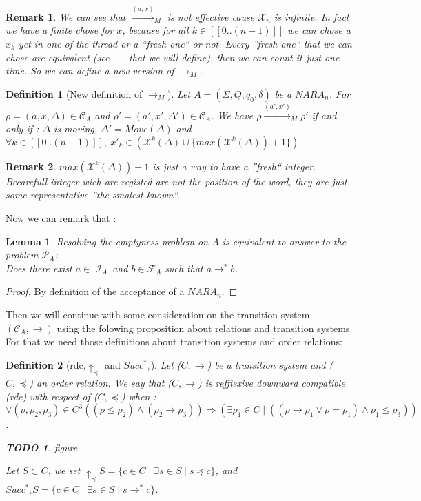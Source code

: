 \documentclass[a4paper,10pt]{report}
\newtheorem{lm}{Lemma}[thr]
\newtheorem{df}{Definition}
\newtheorem{rk}{Remark}
\newtheorem{td}{TODO}
\newcommand{\seg}[1]{[\![#1]\!]}
\newcommand{\ts}{\seg{0 .. (n-1)}}
\newcommand{\C}{\mathcal{C}_{A}}
\newcommand{\I}{\mathcal{I}_{A}}
\newcommand{\F}{\mathcal{F}_{A}}
\newcommand{\Xa}{\mathcal{X}}
\newcommand{\X}{\mathcal{X}_{n}}
\newcommand{\pb}{$\mathcal{P}_{A}$}
\begin{document}
\begin{rk}
  We can see that ${\xrightarrow{(a,x)}}_M$ is not effective cause $\X$ is infinite.
  In fact we have a finite chose for $x$, because for all $ k \in \ts$ we can chose a $x_k$ yet in one of the thread or a ``fresh one`` or not.
  Every ''fresh one`` that we can chose are equivalent (see $\equiv$ that we will define), then we can count it just one time.
  So we can define a new version of ${\xrightarrow{}}_M$. 
\end{rk}

\begin{df}[New definition of $\rightarrow_M$]
  \label{minipb}
  Let $A = (\Sigma ,Q ,q_0, \delta )$ be a $NARA_n$.
  For $\rho = (a,x,\Delta) \in \C$ and $\rho' = (a',x',\Delta') \in \C$.
  We have $\rho {\xrightarrow{(a',x')}}_M \rho'$ if and only if :
  $\Delta$ is moving, $\Delta' = Move(\Delta)$ and $\forall k \in \ts,\ x'_k \in (\Xa^k(\Delta) \cup \{max(\Xa^k(\Delta))+1\}) $  
\end{df}

\begin{rk}
 $max(\Xa^k(\Delta))+1$ is just a way to have a ''fresh`` integer.
 Becarefull integer wich are registed are not the position of the word, they are just some representative ''the smalest known``.  
\end{rk}


Now we can remark that :
\begin{lm}
  \label{lmtth}
  Resolving the emptyness problem on $A$ is equivalent to answer to the problem \pb: \\
  Does there exist $a \in$ $\I$\ and $b \in\F$ such that $ a \rightarrow^* b $. 
\end{lm}
\begin{proof} 
  By definition of the acceptance of a $NARA_n$. 
\end{proof}

Then we will continue with some consideration on the transition system $(\C,\rightarrow)$ using the folowing proposition about relations and transition systems.
For that we need those definitions about transition systems and order relations:

\begin{df}[rdc,$\uparrow_\preceq$ and $ Succ^*_\rightarrow$]
  Let ($C,\rightarrow$) be a transition system and ($C,\preceq$) an order relation.
  We say that ($C,\rightarrow$) is refflexive downward compatible (rdc) with respect of ($C,\preceq$) when :
 $$\forall (\rho,\rho_2,\rho_3) \in C^3  ((\rho \leq \rho_2) \wedge (\rho_2 \rightarrow \rho_3)) \Rightarrow (\exists \rho_1 \in C \mid ((\rho \rightarrow \rho_1 \vee \rho = \rho_1) \wedge \rho_1 \leq \rho_3))$$. 
 \begin{td}
  figure
 \end{td}

  Let $S \subset C$,
  we set $\uparrow_\preceq S = \{c \in C \mid \exists s \in S \mid s \preceq c \}$, and $Succ^*_\rightarrow S = \{c \in C \mid \exists s \in S \mid s \rightarrow^* c \}$.
\end{df}
\end{document}
